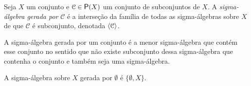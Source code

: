 \begin{definition}
Seja $X$ um conjunto e $\mathcal C \in \p(X)$ um conjunto de subconjuntos de $X$. A \emph{sigma-álgebra gerada por} $\mathcal C$ é a interseção da família de todas as sigma-álgebras sobre $X$ de que $\mathcal C$ é subconjunto, denotada $\left\langle \mathcal C \right\rangle$.
\end{definition}
	
	A sigma-álgebra gerada por um conjunto é a menor sigma-álgebra que contém esse conjunto no sentido que não existe subconjunto dessa sigma-álgebra que contenha o conjunto e também seja uma sigma-álgebra.

\begin{example}
	A sigma-álgebra sobre $X$ gerada por $\emptyset$ é $\{\emptyset, X\}$.
\end{example}




